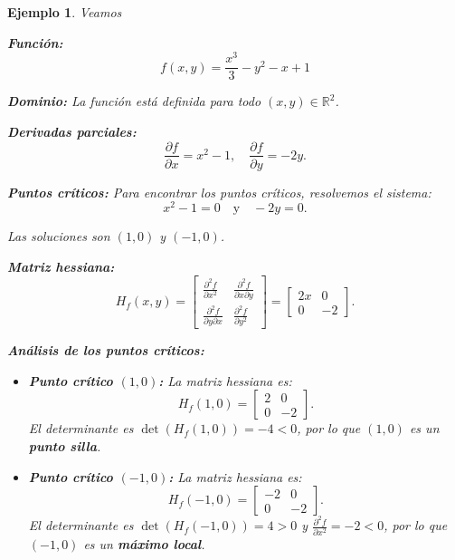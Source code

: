 \documentclass[11pt]{book}
\theoremstyle{definicion}
\theoremstyle{teorema}
\theoremstyle{ejemplo}
\newtheorem{ejemplo}{Ejemplo}[section]
\begin{document}
\begin{ejemplo} Veamos

\textbf{Función: } \[ f(x, y) = \frac{x^3}{3} - y^2 - x + 1 \]

\textbf{Dominio: }
La función está definida para todo \( (x, y) \in \mathbb{R}^2 \).

\textbf{Derivadas parciales:}
\[
\frac{\partial f}{\partial x} = x^2 - 1, \quad \frac{\partial f}{\partial y} = -2y.
\]

\textbf{Puntos críticos:}
Para encontrar los puntos críticos, resolvemos el sistema:
\[
x^2 - 1 = 0 \quad \text{y} \quad -2y = 0.
\]

Las soluciones son \( (1, 0) \) y \( (-1, 0) \).

\textbf{Matriz hessiana:}
\[
H_f(x, y) = \begin{bmatrix}
\frac{\partial^2 f}{\partial x^2} & \frac{\partial^2 f}{\partial x \partial y} \\
\frac{\partial^2 f}{\partial y \partial x} & \frac{\partial^2 f}{\partial y^2}
\end{bmatrix}
= \begin{bmatrix}
2x & 0 \\
0 & -2
\end{bmatrix}.
\]

\textbf{Análisis de los puntos críticos:}
\begin{itemize}
\item \textbf{Punto crítico \( (1, 0) \):}
La matriz hessiana es:
\[
H_f(1, 0) = \begin{bmatrix}
2 & 0 \\
0 & -2
\end{bmatrix}.
\]
El determinante es \( \det(H_f(1, 0)) = -4 < 0 \), por lo que \( (1, 0) \) es un \textbf{punto silla}.

\item \textbf{Punto crítico \( (-1, 0) \):}
La matriz hessiana es:
\[
H_f(-1, 0) = \begin{bmatrix}
-2 & 0 \\
0 & -2
\end{bmatrix}.
\]
El determinante es \( \det(H_f(-1, 0)) = 4 > 0 \) y \( \frac{\partial^2 f}{\partial x^2} = -2 < 0 \), por lo que \( (-1, 0) \) es un \textbf{máximo local}.
\end{itemize}
\end{ejemplo}
\end{document}
